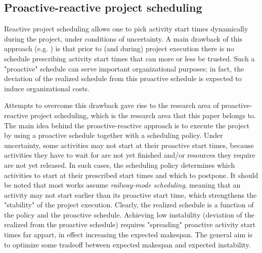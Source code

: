 \subsection{Proactive-reactive project scheduling}
	
	Reactive project scheduling allows one to pick activity start times dynamically
	during the project, under conditions of uncertainty.
	A main drawback of this approach 
	(e.g. \cite{herroelen2004construction,herroelen2004robust,braeckmans2005proactive})
	is that prior to (and during) project execution there is no 
	schedule prescribing activity start times that can more or less be trusted.
	Such a "proactive" schedule can serve important organizational purposes;
	in fact, the deviation of the realized schedule from this proactive schedule
	is expected to induce organizational costs.
	
	Attempts to overcome this drawback gave rise to the research area of
	proactive-reactive project scheduling,
	which is the research area that this paper belongs to.
	The main idea behind the proactive-reactive approach is to execute the project by using
	a proactive schedule together with a scheduling policy.
	Under uncertainty, some activities may not start at their proactive start times,
	because activities they have to wait for are not yet finished and/or
	resources they require are not yet released.
	In such cases, the scheduling policy determines which activities to start at their
	prescribed start times and which to postpone.
	It should be noted that most works assume \emph{railway-mode scheduling},
	meaning that an activity may not start earlier than its proactive start time,
	which strengthens the "stability" of the project execution.
	Clearly, the realized schedule is a function of the policy and the proactive schedule.	
	Achieving low instability (deviation of the realized from the proactive schedule)
	requires "spreading" proactive activity start times far appart, 
	in effect increasing the expected makespan.
	The general aim is to optimize some tradeoff between expected makespan and expected instability.
	
